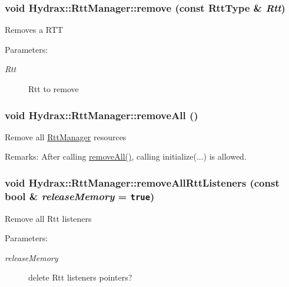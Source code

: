 \begin{CompactItemize}
{\subsubsection[{remove}]{\setlength{\rightskip}{0pt plus 5cm}void Hydrax::RttManager::remove (const {\bf RttType} \& {\em Rtt})}}
\label{class_hydrax_1_1_rtt_manager_360139ed63706da8ca9ec04716d65574}


Removes a RTT \begin{Desc}
\item[Parameters:]
\begin{description}
\item[{\em Rtt}]Rtt to remove \end{description}
\end{Desc}
\hypertarget{class_hydrax_1_1_rtt_manager_ed71ea727ed3c835d655437d1c6de232}{
\subsubsection[{removeAll}]{\setlength{\rightskip}{0pt plus 5cm}void Hydrax::RttManager::removeAll ()}}
\label{class_hydrax_1_1_rtt_manager_ed71ea727ed3c835d655437d1c6de232}


Remove all \hyperlink{class_hydrax_1_1_rtt_manager}{RttManager} resources \begin{Desc}
\item[Remarks:]After calling \hyperlink{class_hydrax_1_1_rtt_manager_ed71ea727ed3c835d655437d1c6de232}{removeAll()}, calling initialize(...) is allowed. \end{Desc}
\hypertarget{class_hydrax_1_1_rtt_manager_4aee49693758d34cdd0b613f251e09cc}{
\subsubsection[{removeAllRttListeners}]{\setlength{\rightskip}{0pt plus 5cm}void Hydrax::RttManager::removeAllRttListeners (const bool \& {\em releaseMemory} = {\tt true})}}
\label{class_hydrax_1_1_rtt_manager_4aee49693758d34cdd0b613f251e09cc}


Remove all Rtt listeners \begin{Desc}
\item[Parameters:]
\begin{description}
\item[{\em releaseMemory}]delete Rtt listeners pointers? \end{description}
\end{Desc}
\hypertarget{class_hydrax_1_1_rtt_manager_9de0d5171c46f27d34493f85e6a4f8c3}{
}
\end{CompactItemize}
